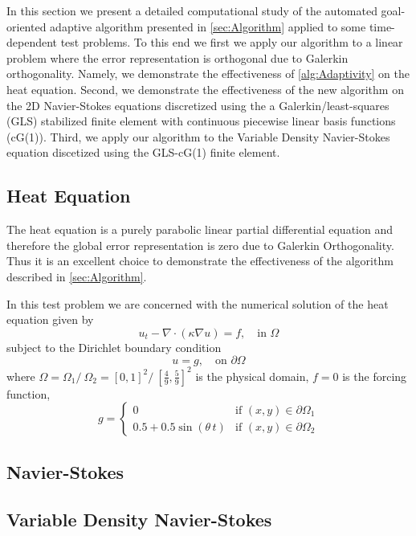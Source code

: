 In this section we present a detailed computational study of the automated
goal-oriented adaptive algorithm presented in \autoref{sec:Algorithm} applied to
some time-dependent test problems. To this end we first we apply our algorithm
to a linear problem where the error representation is orthogonal due to Galerkin
orthogonality. Namely, we demonstrate the effectiveness of
\autoref{alg:Adaptivity} on the heat equation. Second, we demonstrate the
effectiveness of the new algorithm on the 2D Navier-Stokes equations
discretized using the a Galerkin/least-squares (GLS) stabilized finite element
with continuous piecewise linear basis functions (cG(1)). Third, we apply our
algorithm to the Variable Density Navier-Stokes equation discetized using the
GLS-cG(1) finite element.

\subsection{Heat Equation} \label{sse:Heat}
  The heat equation is a purely parabolic linear partial differential equation
  and therefore the global error representation is zero due to Galerkin
  Orthogonality.  Thus it is an excellent choice to demonstrate the
  effectiveness of the algorithm described in \autoref{sec:Algorithm}.

  In this test problem we are concerned with the numerical solution of the heat
  equation given by
  \begin{equation}
    u_t - \nabla \cdot (\kappa \nabla u) = f, \quad \text{in } \Omega
    \label{eq:Heat}
  \end{equation}
  subject to the Dirichlet boundary condition
  \begin{equation}
    u = g, \quad \text{on } \partial \Omega
    \label{eqn:HeatBC}
  \end{equation}
  where $\Omega = \Omega_1\slash~\Omega_2 = [0, 1]^2\slash~[\frac{4}{9},
  \frac{5}{9}]^2$ is the physical domain, $f=0$ is the forcing function,
  \begin{equation}
    g = \begin{cases}
        0 & \text{if } (x,y) \in \partial \Omega_1 \\
        0.5 + 0.5 \sin(\theta\, t) & \text{if } (x,y) \in \partial \Omega_2
    \end{cases}
    \label{eqn:BCFunction}
  \end{equation}

\subsection{Navier-Stokes} \label{sse:NSE}

\subsection{Variable Density Navier-Stokes} \label{sse:rhoNSE}
